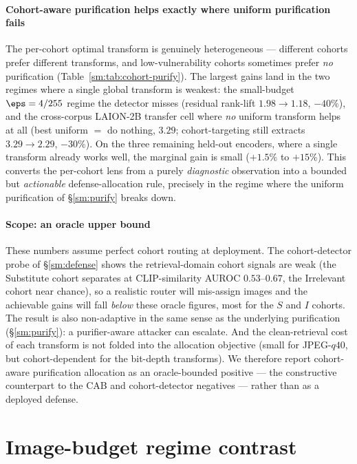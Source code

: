\paragraph{Cohort-aware purification helps exactly where uniform purification fails} The per-cohort optimal transform is genuinely heterogeneous --- different cohorts prefer different transforms, and low-vulnerability cohorts sometimes prefer \emph{no} purification (Table~\ref{sm:tab:cohort-purify}). The largest gains land in the two regimes where a single global transform is weakest: the small-budget $\eps = 4/255$ regime the detector misses (residual rank-lift $1.98 \to 1.18$, $-40\%$), and the cross-corpus LAION-2B transfer cell where \emph{no} uniform transform helps at all (best uniform $=$ do nothing, $3.29$; cohort-targeting still extracts $3.29 \to 2.29$, $-30\%$). On the three remaining held-out encoders, where a single transform already works well, the marginal gain is small ($+1.5\%$ to $+15\%$). This converts the per-cohort lens from a purely \emph{diagnostic} observation into a bounded but \emph{actionable} defense-allocation rule, precisely in the regime where the uniform purification of \S\ref{sm:purify} breaks down.

\paragraph{Scope: an oracle upper bound} These numbers assume perfect cohort routing at deployment. The cohort-detector probe of \S\ref{sm:defense} shows the retrieval-domain cohort signals are weak (the Substitute cohort separates at CLIP-similarity AUROC $0.53$--$0.67$, the Irrelevant cohort near chance), so a realistic router will mis-assign images and the achievable gains will fall \emph{below} these oracle figures, most for the $S$ and $I$ cohorts. The result is also non-adaptive in the same sense as the underlying purification (\S\ref{sm:purify}): a purifier-aware attacker can escalate. And the clean-retrieval cost of each transform is not folded into the allocation objective (small for JPEG-$q40$, but cohort-dependent for the bit-depth transforms). We therefore report cohort-aware purification allocation as an oracle-bounded positive --- the constructive counterpart to the CAB and cohort-detector negatives --- rather than as a deployed defense.

\section{Image-budget regime contrast}
\label{sm:image_budget}

